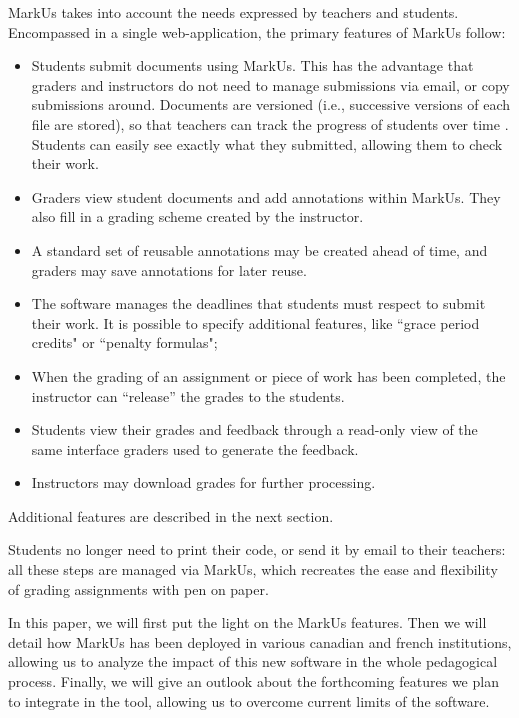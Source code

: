 \documentclass[twocolumn,10pt]{asme2e}
\begin{document}
MarkUs takes into account the needs expressed by teachers and students. Encompassed in a single web-application, the primary features of MarkUs follow:
\begin{itemize}
\item Students submit documents using MarkUs. This has the advantage that graders and instructors do not need to manage submissions via email, or copy submissions around. Documents are versioned (i.e., successive versions of each file are stored), so that teachers can track the progress of students over time \cite{Reid05learningby}. Students can easily see exactly what they submitted, allowing them to check their work.
\item Graders view student documents and add annotations within MarkUs. They also fill in a grading scheme created by the instructor. 
\item A standard set of reusable annotations may be created ahead of time, and graders may save annotations for later reuse.
\item The software manages the deadlines that students must respect to submit their work. It is possible to specify additional features, like ``grace period credits" or ``penalty formulas";
\item When the grading of an assignment or piece of work has been completed, the instructor can ``release'' the grades to the students.
\item Students view their grades and feedback through a read-only view of the same interface graders used to generate the feedback.
\item Instructors may download grades for further processing.
\end{itemize}

Additional features are described in the next section.

Students no longer need to print their code, or send it by email to their teachers: all these steps are managed via MarkUs, which recreates the ease and flexibility of grading assignments with pen on paper. 

In this paper, we will first put the light on the MarkUs features. Then we will detail how MarkUs has been deployed in various canadian and french institutions, allowing us to analyze the impact of this new software in the whole pedagogical process. Finally, we will give an outlook about the forthcoming features we plan to integrate in the tool, allowing us to overcome current limits of the software. 
\end{document}
